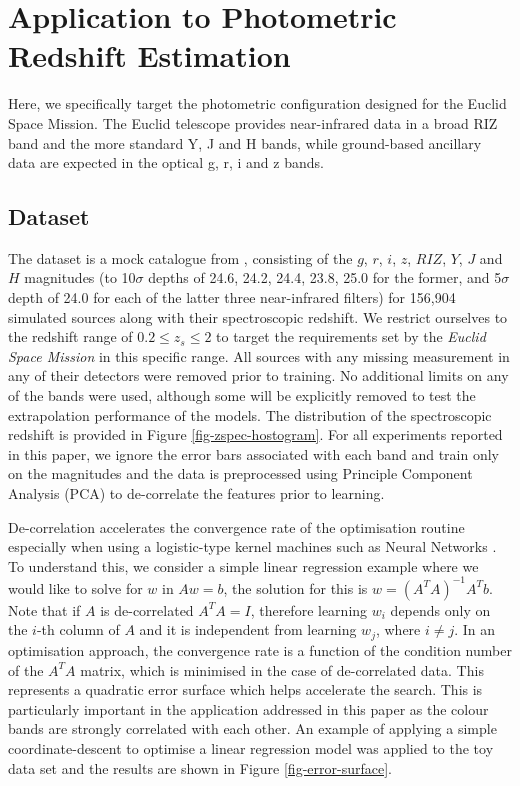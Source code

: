 \documentclass[useAMS,usenatbib,fleqn]{mn2e}
\begin{document}
\section{Application to Photometric Redshift Estimation}
\label{sec-application}

Here, we specifically target the photometric configuration designed for the Euclid Space Mission. The Euclid telescope provides near-infrared data in a broad RIZ band and the more standard Y, J and H bands, while ground-based ancillary data are expected in the optical g, r, i and z bands. 


\subsection{Dataset}
\label{sec-dataset}

The dataset is a mock catalogue from \citet{jouvel09}, consisting of the $g$, $r$, $i$, $z$, $RIZ$, $Y$, $J$ and $H$ magnitudes (to 10$\sigma$ depths of 24.6, 24.2, 24.4, 23.8, 25.0 for the former, and 5$\sigma$ depth of 24.0 for each of the latter three near-infrared filters) for 156,904 simulated sources along with their spectroscopic redshift. We restrict ourselves to the redshift range of $0.2 \le z_{s} \le 2$ to target the requirements set by the {\em Euclid Space Mission} in this specific range. All sources with any missing measurement in any of their detectors were removed prior to training. No additional limits on any of the bands were used, although some will be explicitly removed to test the extrapolation performance of the models. The distribution of the spectroscopic redshift is provided in Figure \ref{fig-zspec-hostogram}. For all experiments reported in this paper, we ignore the error bars associated with each band and train only on the magnitudes and the data is preprocessed using Principle Component Analysis (PCA) \citep{jolliffe1986} to de-correlate the features prior to learning. 

De-correlation accelerates the convergence rate of the optimisation routine especially when using a logistic-type kernel machines such as Neural Networks \citep{lecun1998}. To understand this, we consider a simple linear regression example where we would like to solve for $w$ in $Aw=b$, the solution for this is $w=\left(A^{T}A\right)^{-1}A^{T}b$. Note that if $A$ is de-correlated $A^{T}A=I$, therefore learning $w_{i}$ depends only on the $i$-th column of $A$ and it is independent from learning $w_{j}$, where $i\ne j$. In an optimisation approach, the convergence rate is a function of the condition number of the $A^{T}A$ matrix, which is minimised in the case of de-correlated data. This represents a quadratic error surface which helps accelerate the search. This is particularly important in the application addressed in this paper as the colour bands are strongly correlated with each other. An example of applying a simple coordinate-descent to optimise a linear regression model was applied to the toy data set and the results are shown in Figure \ref{fig-error-surface}.
\end{document}
